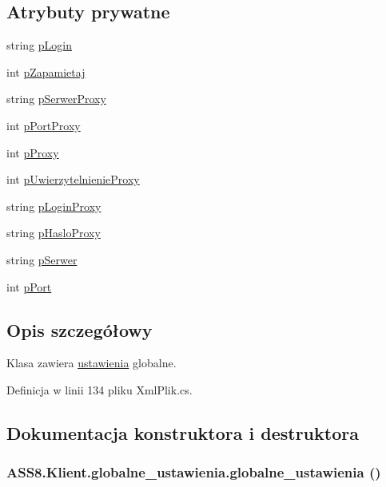 \subsection*{Atrybuty prywatne}
\begin{CompactItemize}
\item 
string \hyperlink{a00006_718e259a83e902c51ffc2e742ae8b371}{pLogin}
\item 
int \hyperlink{a00006_b918671787c5b7264e76a3e76fc52918}{pZapamietaj}
\item 
string \hyperlink{a00006_eb2a6e80b87d933f6f581c887fe7721a}{pSerwerProxy}
\item 
int \hyperlink{a00006_d701fffac41ccc3a675e437a547e26d0}{pPortProxy}
\item 
int \hyperlink{a00006_012b3ffa792fe763c5f4b4470480b365}{pProxy}
\item 
int \hyperlink{a00006_82437c0fe04aa5e09bdd4af00697380f}{pUwierzytelnienieProxy}
\item 
string \hyperlink{a00006_63bc0cc240b78bf92027ac14c2f2a36a}{pLoginProxy}
\item 
string \hyperlink{a00006_2b018bb4bb880ffcf042cfebb2b4cc2d}{pHasloProxy}
\item 
string \hyperlink{a00006_af9c6a39d06c2eb5763aa7d1382032fe}{pSerwer}
\item 
int \hyperlink{a00006_061e57c63e869568d9baf66a0e6add85}{pPort}
\end{CompactItemize}


\subsection{Opis szczegółowy}
Klasa zawiera \hyperlink{a00028}{ustawienia} globalne. 



Definicja w linii 134 pliku XmlPlik.cs.

\subsection{Dokumentacja konstruktora i destruktora}
\hypertarget{a00006_3c6e77468b75fe3323a0b4ed40c41414}{
\subsubsection[{globalne\_\-ustawienia}]{\setlength{\rightskip}{0pt plus 5cm}ASS8.Klient.globalne\_\-ustawienia.globalne\_\-ustawienia ()}}
\label{de/d21/a00006_3c6e77468b75fe3323a0b4ed40c41414}




